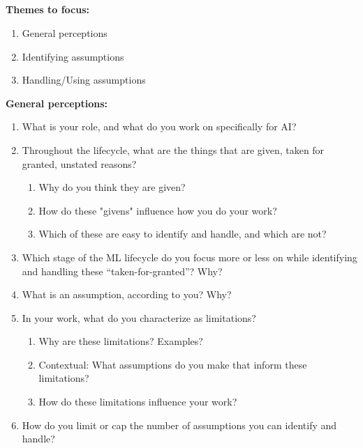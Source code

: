 \subsection{}
\label{interview}

\noindent \textbf{Themes to focus:}
\begin{enumerate}
\item General perceptions
 \item Identifying assumptions
    \item Handling/Using assumptions
\end{enumerate}

\smallskip
\noindent \textbf{General perceptions:}
\begin{enumerate}
    \item What is your role, and what do you work on specifically for AI?
    \item Throughout the lifecycle, what are the things that are given, taken for granted, unstated reasons?
    \begin{enumerate}
        \item Why do you think they are given?
        \item How do these "givens" influence how you do your work?
        \item Which of these are easy to identify and handle, and which are not?
    \end{enumerate}
    \item Which stage of the ML lifecycle do you focus more or less on while identifying and handling these “taken-for-granted”? Why?
    \item What is an assumption, according to you? Why? 
    \item In your work, what do you characterize as limitations?
    \begin{enumerate}
        \item Why are these limitations? Examples?
        \item Contextual: What assumptions do you make that inform these limitations?
        \item How do these limitations influence your work?
    \end{enumerate} 
    \item How do you limit or cap the number of assumptions you can identify and handle?
\end{enumerate}

